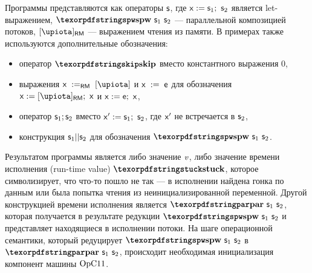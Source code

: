 Программы представляются как операторы $\mathsf{s}$, где ${\mathsf{x}} := {\mathsf{s}_{1}};~{\mathsf{s}_{2}}$ является let-выражением,
$\Spw{\AST_{1}}{\AST_{2}}$ --- параллельной композицией потоков,
$\readExpr{\RM}{\locVar}$ --- выражением чтения из памяти.
В примерах также используются дополнительные обозначения:
\begin{itemize}
\item оператор $\skipc$ вместо константного выражения $0$,
\item выражения $\readInstParam{\RM}{\vName}{\locVar}$ и $\mathsf{x}\;:=\;\mathsf{e}$ для обозначения
$\Bind{\vName}{\readExpr{\RM}{\locVar}}{\Ret{\vName}}$ и ${\mathsf{x}} := {\mathsf{e}};~{\mathsf{x}}$,
\item оператор $\mathsf{s}_{1}; \mathsf{s}_{2}$ вместо ${\mathsf{x}'} := {\mathsf{s}_{1}};~{\mathsf{s}_{2}}$, где $\mathsf{x}'$ не встречается в $\mathsf{s}_{2}$,
\item конструкция $\mathsf{s}_{1} {\sf ||} \mathsf{s}_{2}$ для обозначения $\Spw{\AST_{1}}{\AST_{2}}$.
\end{itemize}

Результатом программы является либо значение $\text{\emph{v}}$,
либо значение времени исполнения (run-time value) $\Stuck$, которое символизирует, что что-то пошло не так ---
в исполнении найдена гонка по данным или была попытка чтения из неинициализированной переменной.
Другой конструкцией времени исполнения является $\Par{\AST_{1}}{\AST_{2}}$, которая получается
в результате редукции $\Spw{\AST_{1}}{\AST_{2}}$ и представляет находящиеся в исполнении потоки.
На шаге операционной семантики, который редуцирует $\Spw{\AST_{1}}{\AST_{2}}$ в $\Par{\AST_{1}}{\AST_{2}}$,
происходит необходимая инициализация компонент машины $\mathrm{OpC11}$.

